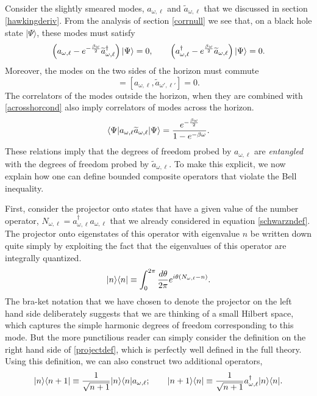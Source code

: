 \documentclass[12pt]{article}
\def\schwarzn{N}
\newcommand{\cop}[1]{#1}
\def\ta{\widetilde{\cop{a}}}
\newcommand{\be}{\begin{equation}}
\newcommand{\ee}{\end{equation}}
\begin{document}
 

Consider the slightly smeared modes, $a_{\omega, \ell}$ and $\ta_{\omega, \ell}$ that we discussed in section \ref{hawkingderiv}. From the analysis of section \ref{corrnull} we see that, on a black hole state $|\Psi \rangle$, these modes must satisfy
\be
\label{acrosshorcond}
\left(a_{\omega, \ell}  - e^{-{\beta \omega \over 2}} \ta_{\omega, \ell}^{\dagger}\right)|\Psi \rangle = 0, \qquad
\left( a_{\omega, \ell}^{\dagger} - e^{ {\beta \omega \over 2}} \ta_{\omega, \ell} \right) |\Psi \rangle = 0. 
\ee
Moreover, the modes on the two sides of the horizon must commute 
\be
[a_{\omega, \ell}, \ta_{\omega', \ell'}^{\dagger}] = [a_{\omega, \ell}, \ta_{\omega', \ell'}] = 0.
\ee
The correlators of the modes outside the horizon, when they are combined with \eqref{acrosshorcond} also imply 
correlators of modes across the horizon.
\be
\label{acrosshorcorr}
\langle \Psi | a_{\omega, \ell}  \ta_{\omega, \ell} |\Psi \rangle = {e^{-{\beta \omega \over 2}} \over 1 - e^{-\beta \omega}}.
\ee
These relations imply that the degrees of freedom probed by $a_{\omega, \ell}$ are {\em entangled} with the degrees of freedom probed by $\ta_{\omega, \ell}$.  To make this explicit, we now explain how one can define bounded composite operators that violate the Bell inequality.

First, consider the projector onto states that have a given value of the number operator, $\schwarzn_{\omega, \ell} = a_{\omega, \ell}^{\dagger} a_{\omega, \ell}$ that we already considered in equation \eqref{schwarzndef}. The projector onto eigenstates of this operator with eigenvalue $n$  be written down quite simply by exploiting the fact that the eigenvalues of this operator are integrally quantized.
\be
\label{projectdef}
|n \rangle \langle n | \equiv \int_0^{2 \pi} {d \theta \over 2 \pi} e^{i \theta (\schwarzn_{\omega, \ell} - n)}.
\ee
The bra-ket notation that we have chosen to denote the projector on the left hand side deliberately suggests that we are thinking of a small Hilbert space, which captures the simple harmonic degrees of freedom corresponding to this mode. But the more punctilious reader can simply consider the definition on the right hand side of \eqref{projectdef}, which is perfectly well defined in the full theory. Using this definition, we can also construct two additional operators,
\be
\label{raiselowerdef}
|n \rangle \langle n+1| \equiv  {1 \over \sqrt{n+1}} |n \rangle \langle n | a_{\omega, \ell}; \qquad 
|n + 1\rangle \langle n| \equiv  {1 \over \sqrt{n+1}} a_{\omega, \ell}^{\dagger} |n \rangle \langle n |.  
\ee
\end{document}
